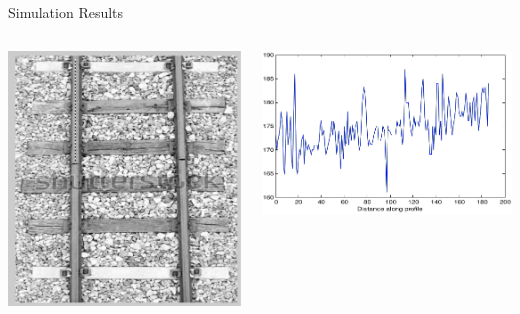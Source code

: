 \begin{frame}{Simulation Results}
    
    \begin{columns}
        \begin{column}{0.45\textwidth}
            \includegraphics[width=\columnwidth]{figures/railway2.png}
        \end{column}
        \hfill
        \begin{column}{0.45\textwidth}
            \includegraphics[width=\columnwidth]{figures/railway3.png}
        \end{column}
    \end{columns}

\end{frame}


